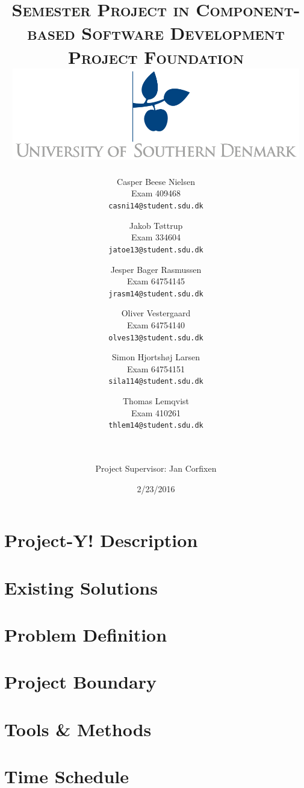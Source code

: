 \documentclass[11pt]{article}
\title{
\Huge{\textsc{Semester Project in Component-based Software Development}}\\[0.7cm]
\large{\textsc{Project Foundation}}\\[1cm]
\includegraphics[height=4cm]{sdu-fp2.png}\\[3cm]}
\author{
  Casper Beese Nielsen\\
  Exam \textnumero{} 409468\\
  \texttt{casni14@student.sdu.dk}
  \and
  Jakob Tøttrup\\
  Exam \textnumero{} 334604\\
  \texttt{jatoe13@student.sdu.dk}
  \and
  Jesper Bager Rasmussen\\
  Exam \textnumero{} 64754145\\
  \texttt{jrasm14@student.sdu.dk}
  \and
  Oliver Vestergaard\\
  Exam \textnumero{} 64754140\\
  \texttt{olves13@student.sdu.dk}
  \and
  Simon Hjortshøj Larsen\\
  Exam \textnumero{} 64754151\\
  \texttt{sila114@student.sdu.dk}
  \and
  Thomas Lemqvist\\
  Exam \textnumero{} 410261\\  
  \texttt{thlem14@student.sdu.dk}
  \and
  \\ \\ Project Supervisor: Jan Corfixen
}
\date{2/23/2016}
\begin{document}
\pagestyle{fancy}
\fancyhf{}

\maketitle
\thispagestyle{empty}
\newpage
{}
\renewcommand\contentsname{Table of Contents}
\setcounter{tocdepth}{2}
\tableofcontents

\newpage
{}

\section{Project-Y! Description}
\label{sec:init}


\section{Existing Solutions}
\label{sec:exist}


\section{Problem Definition}
\label{sec:def}


\section{Project Boundary}
\label{sec:bound}


\section{Tools \& Methods}
\label{sec:tools}


\section{Time Schedule}
\label{sec:time}

\end{document}
